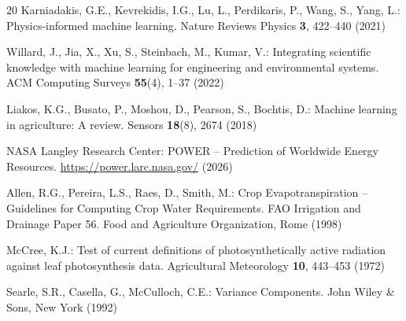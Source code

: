 \documentclass[runningheads]{llncs}
\begin{document}
\begin{thebibliography}{20}
Karniadakis, G.E., Kevrekidis, I.G., Lu, L., Perdikaris, P., Wang, S., Yang, L.: Physics-informed machine learning. Nature Reviews Physics \textbf{3}, 422--440 (2021)

Willard, J., Jia, X., Xu, S., Steinbach, M., Kumar, V.: Integrating scientific knowledge with machine learning for engineering and environmental systems. ACM Computing Surveys \textbf{55}(4), 1--37 (2022)

Liakos, K.G., Busato, P., Moshou, D., Pearson, S., Bochtis, D.: Machine learning in agriculture: A review. Sensors \textbf{18}(8), 2674 (2018)

NASA Langley Research Center: POWER -- Prediction of Worldwide Energy Resources. \url{https://power.larc.nasa.gov/} (2026)

Allen, R.G., Pereira, L.S., Raes, D., Smith, M.: Crop Evapotranspiration -- Guidelines for Computing Crop Water Requirements. FAO Irrigation and Drainage Paper 56. Food and Agriculture Organization, Rome (1998)

McCree, K.J.: Test of current definitions of photosynthetically active radiation against leaf photosynthesis data. Agricultural Meteorology \textbf{10}, 443--453 (1972)

Searle, S.R., Casella, G., McCulloch, C.E.: Variance Components. John Wiley \& Sons, New York (1992)

\end{thebibliography}
\end{document}
